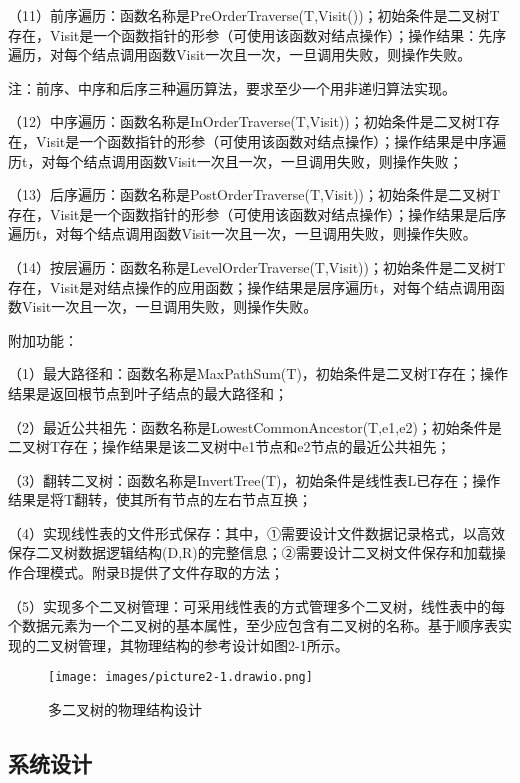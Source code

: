 \documentclass[supercite]{Experimental_Report}
\theoremstyle{definition}
\begin{document}
（11）前序遍历：函数名称是PreOrderTraverse(T,Visit())；初始条件是二叉树T存在，Visit是一个函数指针的形参（可使用该函数对结点操作）；操作结果：先序遍历，对每个结点调用函数Visit一次且一次，一旦调用失败，则操作失败。

注：前序、中序和后序三种遍历算法，要求至少一个用非递归算法实现。

（12）中序遍历：函数名称是InOrderTraverse(T,Visit))；初始条件是二叉树T存在，Visit是一个函数指针的形参（可使用该函数对结点操作）；操作结果是中序遍历t，对每个结点调用函数Visit一次且一次，一旦调用失败，则操作失败；

（13）后序遍历：函数名称是PostOrderTraverse(T,Visit))；初始条件是二叉树T存在，Visit是一个函数指针的形参（可使用该函数对结点操作）；操作结果是后序遍历t，对每个结点调用函数Visit一次且一次，一旦调用失败，则操作失败。

（14）按层遍历：函数名称是LevelOrderTraverse(T,Visit))；初始条件是二叉树T存在，Visit是对结点操作的应用函数；操作结果是层序遍历t，对每个结点调用函数Visit一次且一次，一旦调用失败，则操作失败。

附加功能：

（1）最大路径和：函数名称是MaxPathSum(T)，初始条件是二叉树T存在；操作结果是返回根节点到叶子结点的最大路径和；

（2）最近公共祖先：函数名称是LowestCommonAncestor(T,e1,e2)；初始条件是二叉树T存在；操作结果是该二叉树中e1节点和e2节点的最近公共祖先；

（3）翻转二叉树：函数名称是InvertTree(T)，初始条件是线性表L已存在；操作结果是将T翻转，使其所有节点的左右节点互换；

（4）实现线性表的文件形式保存：其中，①需要设计文件数据记录格式，以高效保存二叉树数据逻辑结构(D,{R})的完整信息；②需要设计二叉树文件保存和加载操作合理模式。附录B提供了文件存取的方法；

（5）实现多个二叉树管理：可采用线性表的方式管理多个二叉树，线性表中的每个数据元素为一个二叉树的基本属性，至少应包含有二叉树的名称。基于顺序表实现的二叉树管理，其物理结构的参考设计如图2-1所示。

\begin{figure}[H]
	\begin{center}
		\texttt{[image: images/picture2-1.drawio.png]}
		\vspace{0.6cm}
		\caption{多二叉树的物理结构设计}
		\label{fig2-1}
	\end{center}
\end{figure}

\subsection{系统设计}
\end{document}
